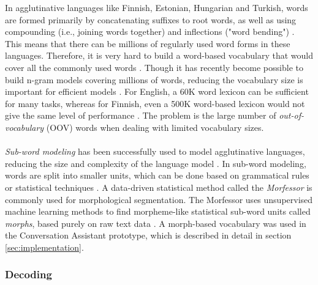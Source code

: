 \documentclass[english, 12pt, a4paper, pdftex, elec, utf8]{aaltothesis}
\begin{document}
In agglutinative languages like Finnish, Estonian, Hungarian and Turkish, words are formed primarily by concatenating suffixes to root words, as well as using compounding (i.e., joining words together) and inflections ("word bending") \cite{arisoy2008statistical, kurimo2006unlimited, hirsimaki2006unlimited}. This means that there can be millions of regularly used word forms in these languages. Therefore, it is very hard to build a word-based vocabulary that would cover all the commonly used words \cite{arisoy2008statistical}. Though it has recently become possible to build n-gram models covering millions of words, reducing the vocabulary size is important for efficient models \cite{smit17boundaries}. For English, a 60K word lexicon can be sufficient for many tasks, whereas for Finnish, even a 500K word-based lexicon would not give the same level of performance \cite{arisoy2008statistical}. The problem is the large number of \textit{out-of-vocabulary} (OOV) words when dealing with limited vocabulary sizes. \\\\
\textit{Sub-word modeling} has been successfully used to model agglutinative languages, reducing the size and complexity of the language model \cite{enarvi2017automatic, hirsimaki2006unlimited, hirsimaki2009importance, smit17boundaries}. In sub-word modeling, words are split into smaller units, which can be done based on grammatical rules or statistical techniques \cite{arisoy2008statistical}. A data-driven statistical method called the \textit{Morfessor} is commonly used for morphological segmentation. The Morfessor uses unsupervised machine learning methods to find morpheme-like statistical sub-word units called \textit{morphs}, based purely on raw text data \cite{arisoy2008statistical, kurimo2006unlimited}. A morph-based vocabulary was used in the Conversation Assistant prototype, which is described in detail in section \ref{sec:implementation}.

\subsubsection{Decoding} \label{sec:decoding}
\end{document}
